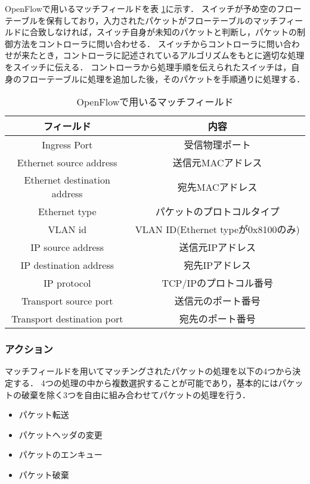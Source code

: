 OpenFlowで用いるマッチフィールドを表 \ref{tab:2-1}に示す\cite{openflow}．
スイッチが予め空のフローテーブルを保有しており，入力されたパケットがフローテーブルのマッチフィールドに合致しなければ，スイッチ自身が未知のパケットと判断し，パケットの制御方法をコントローラに問い合わせる．
スイッチからコントローラに問い合わせが来たとき，コントローラに記述されているアルゴリズムをもとに適切な処理をスイッチに伝える．
コントローラから処理手順を伝えられたスイッチは，自身のフローテーブルに処理を追加した後，そのパケットを手順通りに処理する．

\begin{table}[bt]
	\begin{center}
		\caption{OpenFlowで用いるマッチフィールド}
		\begin{tabular}{c|c}
			\hline \hline
			フィールド & 内容　\\ \hline
			Ingress Port & 受信物理ポート　\\
			Ethernet source address & 送信元MACアドレス \\
			Ethernet destination address & 宛先MACアドレス　\\
			Ethernet type & パケットのプロトコルタイプ \\
			VLAN id & VLAN ID(Ethernet typeが0x8100のみ)　\\
			IP source address & 送信元IPアドレス　\\
			IP destination address & 宛先IPアドレス　\\
			IP protocol & TCP/IPのプロトコル番号　\\
			Transport source port & 送信元のポート番号　\\
			Transport destination port & 宛先のポート番号\\ \hline
		\end{tabular}
		\label{tab:2-1}
	\end{center}
\end{table}

\subsubsection{アクション}

マッチフィールドを用いてマッチングされたパケットの処理を以下の4つから決定する\cite{openflowjapanese}．
4つの処理の中から複数選択することが可能であり，基本的にはパケットの破棄を除く3つを自由に組み合わせてパケットの処理を行う．

\begin{itemize}
	\item パケット転送
	\item パケットヘッダの変更
	\item パケットのエンキュー
	\item パケット破棄
\end{itemize}

